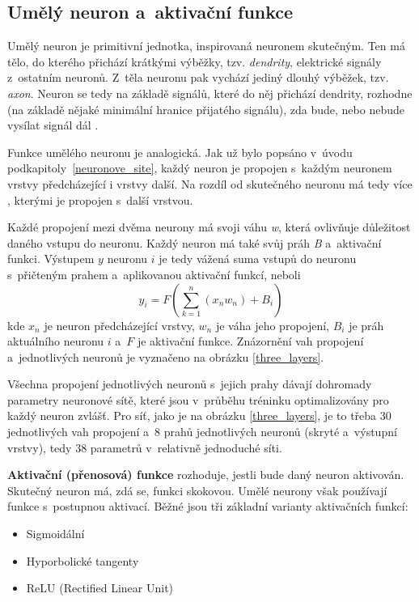 \subsection{Umělý neuron a~aktivační funkce}
Umělý neuron je primitivní jednotka, inspirovaná neuronem skutečným. Ten má tělo, do kterého přichází krátkými výběžky, tzv. \emph{dendrity}, elektrické signály z~ostatním neuronů. Z~těla neuronu pak vychází jediný dlouhý výběžek, tzv. \emph{axon}. Neuron se tedy na základě signálů, které do něj přichází dendrity, rozhodne (na základě nějaké minimální hranice přijatého signálu), zda bude, nebo nebude vysílat signál dál \cite{wiki:neuron}.\par
Funkce umělého neuronu je analogická. Jak už bylo popsáno v~úvodu podkapitoly~\ref{neuronove_site}, každý neuron je propojen s~každým neuronem vrstvy předcházející i vrstvy další. Na rozdíl od skutečného neuronu má tedy více , kterými je propojen s~další vrstvou.\par
Každé propojení mezi dvěma neurony má svoji váhu \emph{w}, která ovlivňuje důležitost daného vstupu do neuronu. Každý neuron má také svůj práh \emph{B} a~aktivační funkci. Výstupem $y$ neuronu $i$ je tedy vážená suma vstupů do neuronu s~přičteným prahem a~aplikovanou aktivační funkcí, neboli 
\begin{equation}
y_i = F({\sum_{k=1}^n ({x_n}w_n)} + B_i)
\end{equation}
kde $x_n$ je neuron předcházející vrstvy, $w_n$ je váha jeho propojení, $B_i$ je práh aktuálního neuronu $i$ a~$F$ je aktivační funkce. Znázornění vah propojení a~jednotlivých neuronů je vyznačeno na obrázku \ref{three_layers}.\par
Všechna propojení jednotlivých neuronů s~jejich prahy dávají dohromady parametry neuronové sítě, které jsou v~průběhu tréninku optimalizovány pro každý neuron zvlášť. Pro síť, jako je na obrázku \ref{three_layers}, je to třeba 30 jednotlivých vah propojení a~8 prahů jednotlivých neuronů (skryté a~výstupní vrstvy), tedy 38 parametrů v~relativně jednoduché síti.\par
\textbf{Aktivační (přenosová) funkce} rozhoduje, jestli bude daný neuron aktivován. Skutečný neuron má, zdá se, funkci skokovou. Umělé neurony však používají funkce s~postupnou aktivací. Běžné jsou tři základní varianty aktivačních funkcí: 

\begin{itemize}
    \item Sigmoidální
    \item Hyporbolické tangenty
    \item ReLU (Rectified Linear Unit)
\end{itemize}
\pagebreak

